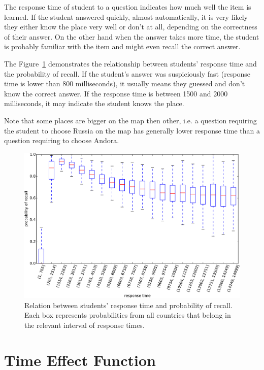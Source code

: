 The response time of student to a question indicates how much well the item is learned. If the student answered quickly, almost automatically, it is very likely they either know the place very well or don't at all, depending on the correctness of their answer. On the other hand when the answer takes more time, the student is probably familiar with the item and might even recall the correct answer.

The Figure~\ref{fig-response-time} demonstrates the relationship between students' response time and the probability of recall. If the student's answer was suspiciously fast (response time is lower than 800 milliseconds), it usually means they guessed and don't know the correct answer. If the response time is between 1500 and 2000 milliseconds, it may indicate the student knows the place.

Note that some places are bigger on the map then other, i.e. a question requiring the student to choose Russia on the map has generally lower response time than a question requiring to choose Andora.

\begin{figure}[htbp]
  \centering
  \includegraphics[width=\textwidth]{img/response-time}
  \caption{Relation between students' response time and probability of recall. Each box represents probabilities from all countries that belong in the relevant interval of response times.}
  \label{fig-response-time}
\end{figure}

\section{Time Effect Function}

